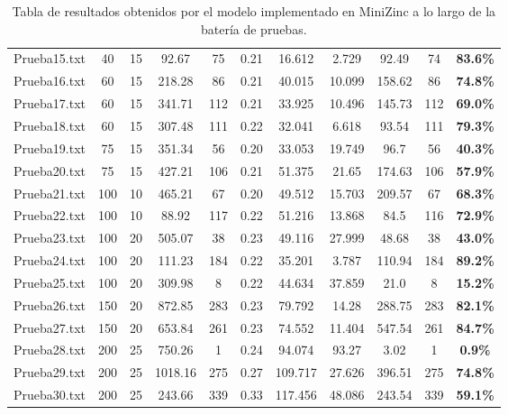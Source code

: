 \documentclass[11pt,letter]{article}
\begin{document}
\begin{table}[H]
{\begin{tabular}{|l|c|c|c|c|c|c|c|c|c|c|}
    Prueba15.txt & 40 & 15 & 92.67 & 75 & 0.21 & 16.612 & 2.729 & 92.49 & 74 & \textbf{83.6\%} \\
    Prueba16.txt & 60 & 15 & 218.28 & 86 & 0.21 & 40.015 & 10.099 & 158.62 & 86 & \textbf{74.8\%} \\
    Prueba17.txt & 60 & 15 & 341.71 & 112 & 0.21 & 33.925 & 10.496 & 145.73 & 112 & \textbf{69.0\%} \\
    Prueba18.txt & 60 & 15 & 307.48 & 111 & 0.22 & 32.041 & 6.618 & 93.54 & 111 & \textbf{79.3\%} \\
    Prueba19.txt & 75 & 15 & 351.34 & 56 & 0.20 & 33.053 & 19.749 & 96.7 & 56 & \textbf{40.3\%} \\
    Prueba20.txt & 75 & 15 & 427.21 & 106 & 0.21 & 51.375 & 21.65 & 174.63 & 106 & \textbf{57.9\%} \\
    Prueba21.txt & 100 & 10 & 465.21 & 67 & 0.20 & 49.512 & 15.703 & 209.57 & 67 & \textbf{68.3\%} \\
    Prueba22.txt & 100 & 10 & 88.92 & 117 & 0.22 & 51.216 & 13.868 & 84.5 & 116 & \textbf{72.9\%} \\
    Prueba23.txt & 100 & 20 & 505.07 & 38 & 0.23 & 49.116 & 27.999 & 48.68 & 38 & \textbf{43.0\%} \\
    Prueba24.txt & 100 & 20 & 111.23 & 184 & 0.22 & 35.201 & 3.787 & 110.94 & 184 & \textbf{89.2\%} \\
    Prueba25.txt & 100 & 20 & 309.98 & 8 & 0.22 & 44.634 & 37.859 & 21.0 & 8 & \textbf{15.2\%} \\
    Prueba26.txt & 150 & 20 & 872.85 & 283 & 0.23 & 79.792 & 14.28 & 288.75 & 283 & \textbf{82.1\%} \\
    Prueba27.txt & 150 & 20 & 653.84 & 261 & 0.23 & 74.552 & 11.404 & 547.54 & 261 & \textbf{84.7\%} \\
    Prueba28.txt & 200 & 25 & 750.26 & 1 & 0.24 & 94.074 & 93.27 & 3.02 & 1 & \textbf{0.9\%} \\
    Prueba29.txt & 200 & 25 & 1018.16 & 275 & 0.27 & 109.717 & 27.626 & 396.51 & 275 & \textbf{74.8\%} \\
    Prueba30.txt & 200 & 25 & 243.66 & 339 & 0.33 & 117.456 & 48.086 & 243.54 & 339 & \textbf{59.1\%} \\
    \hline
    \end{tabular}
    }
    \caption{Tabla de resultados obtenidos por el modelo implementado en MiniZinc a lo largo de la batería de pruebas.}
\end{table}
\end{document}
